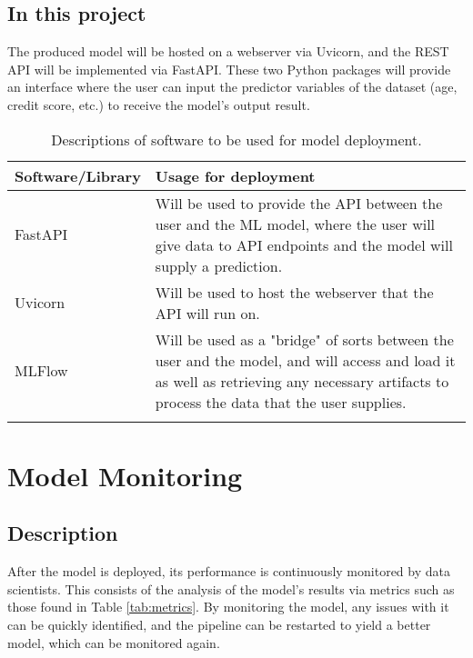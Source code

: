 \subsection{In this project}
The produced model will be hosted on a webserver via Uvicorn, and the REST API will be implemented 
via FastAPI. These two Python packages will provide an interface where the user can input the predictor 
variables of the dataset (age, credit score, etc.) to receive the model's output result.


\begin{longtable}{ |p{}| p{}|}
    \hline
    \cellcolor{blue!25}Software/Library & \cellcolor{blue!25}Usage for deployment\\
    \hline
    FastAPI &
    Will be used to provide the API between the user and the ML model, where the user will 
    give data to API endpoints and the model will supply a prediction.\\
    \hline
    Uvicorn &
    Will be used to host the webserver that the API will run on.\\
    \hline
    MLFlow &
    Will be used as a "bridge" of sorts between the user and the model, and will access and load 
    it as well as retrieving any necessary artifacts to process the data that the user supplies.\\
    \hline
\caption{Descriptions of software to be used for model deployment.}\label{tab:DeploymentSoftware}
\end{longtable}

\pagebreak

\section{Model Monitoring}\label{sec:Monitoring}
\subsection{Description}
After the model is deployed, its performance is continuously monitored by data scientists. This consists of the analysis
of the model's results via metrics such as those found in Table \ref{tab:metrics}. By monitoring the model, any issues 
with it can be quickly identified, and the pipeline can be restarted to yield a better model, which can be monitored again.  

